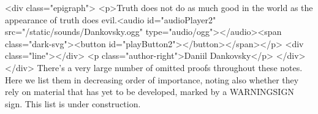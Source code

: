   <div class="epigraph">
    <p>Truth does not do as much good in the world as the appearance of truth does evil.<audio id="audioPlayer2" src="/static/sounds/Dankovsky.ogg" type="audio/ogg"></audio><span class="dark-svg"><button id="playButton2"></button></span></p>
    <div class="line"></div>
    <p class="author-right">Daniil Dankovsky</p>
  </div>
</div>
There's a very large number of omitted proofs throughout these notes. Here we list them in decreasing order of importance, noting also whether they rely on material that has yet to be developed, marked by a WARNINGSIGN sign. This list is under construction.
